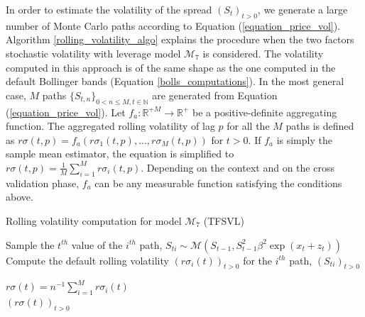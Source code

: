 \documentclass[11pt,a4,twosided,singlespacing,titlepagenumber=on]{scrreprt}
\numberwithin{equation}{chapter} %
\theoremstyle{remark}
\begin{document}
In order to estimate the volatility of the spread $(S_t)_{t>0}$, we generate a large number of Monte Carlo paths according to Equation (\ref{equation_price_vol}). Algorithm \ref{rolling_volatility_algo} explains the procedure when the two factors stochastic volatility with leverage model $\mathcal{M}_7$ is considered. The volatility computed in this approach is of the same shape as the one computed in the default Bollinger bands (Equation \ref{bolls_computations}). In the most general case, $M$ paths $\{S_{t,n}\}_{0 < n \leq M, t \in \mathbb{N}}$ are generated from Equation (\ref{equation_price_vol}). Let $f_a : \mathbb{R}^{+M} \rightarrow \mathbb{R}^+$ be a positive-definite aggregating function. The aggregated rolling volatility of lag $p$ for all the $M$ paths is defined as $r\sigma(t,p) = f_a(r\sigma_1(t, p),...,r\sigma_M(t, p))$ for $t >0$. If $f_a$ is simply the sample mean estimator, the equation is simplified to $r\sigma(t,p) = \frac{1}{M}\sum_{i=1}^M r\sigma_i(t, p)$. Depending on the context and on the cross validation phase, $f_a$ can be any measurable function satisfying the conditions above.

\begin{algorithm}
\caption{Rolling volatility computation for model $\mathcal{M}_7$ (TFSVL)}
\label{rolling_volatility_algo}
\begin{algorithmic}[1]

		\State Sample the $t^{th}$ value of the $i^{th}$ path, $S_{ti} \sim \mathcal{M}(S_{t-1}, S_{t-1}^2 \beta^2 \exp(x_t + z_t))$
	\State Compute the default rolling volatility $(r\sigma_i(t))_{t>0}$ for the $i^{th}$ path, $(S_{ti})_{t>0}$

	\State $\displaystyle{r\sigma(t) = n^{-1} \sum_{i=1}^M r\sigma_i(t)}$
\\
\Return $(r\sigma(t))_{t>0}$
\EndProcedure
\end{algorithmic}
\end{algorithm}
\end{document}
